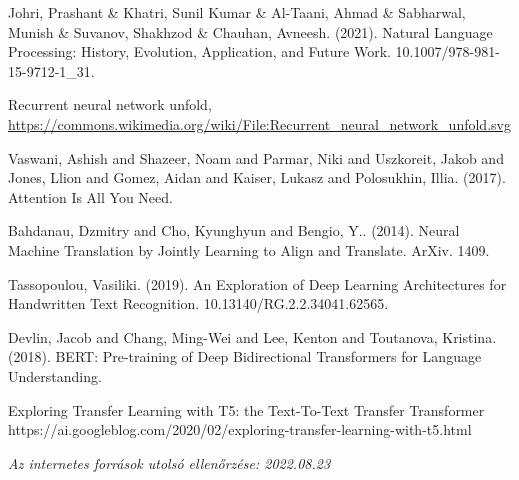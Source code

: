 \documentclass[12pt,a4paper]{report}
\begin{document}


\newpage

\pagestyle{empty}



\cleardoublepage
{}
\tableofcontents
\cleardoublepage
{}

\newpage

\pagestyle{fancy}









\begin{thebibliography}{100}
 Johri, Prashant \& Khatri, Sunil Kumar \& Al-Taani, Ahmad \& Sabharwal, Munish \& Suvanov, Shakhzod \& Chauhan, Avneesh. (2021). Natural Language Processing: History, Evolution, Application, and Future Work. 10.1007/978-981-15-9712-1\_31.

 Recurrent neural network unfold, \url{https://commons.wikimedia.org/wiki/File:Recurrent\_neural\_network\_unfold.svg}

 Vaswani, Ashish and Shazeer, Noam and Parmar, Niki and Uszkoreit, Jakob and Jones, Llion and Gomez, Aidan and Kaiser, Lukasz and Polosukhin, Illia. (2017). Attention Is All You Need.

 Bahdanau, Dzmitry and Cho, Kyunghyun and Bengio, Y.. (2014). Neural Machine Translation by Jointly Learning to Align and Translate. ArXiv. 1409.

 Tassopoulou, Vasiliki. (2019). An Exploration of Deep Learning Architectures for Handwritten Text Recognition. 10.13140/RG.2.2.34041.62565.

 Devlin, Jacob and Chang, Ming-Wei and Lee, Kenton and Toutanova, Kristina. (2018). BERT: Pre-training of Deep Bidirectional Transformers for Language Understanding.

 Exploring Transfer Learning with T5: the Text-To-Text Transfer Transformer https://ai.googleblog.com/2020/02/exploring-transfer-learning-with-t5.html
\end{thebibliography}


\noindent \textit{Az internetes források utolsó ellenőrzése: 2022.08.23}

\pagestyle{empty}

\newpage


\end{document}
